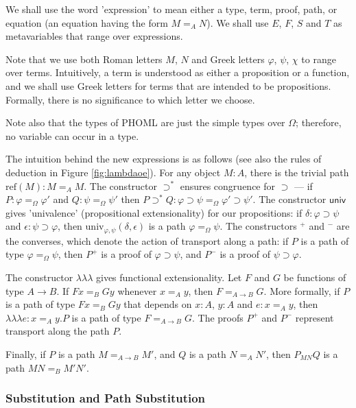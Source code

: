 \documentclass[a4paper,UKenglish]{lipics-v2016}
\newcommand*{\reff}[1]{\ensuremath{\mathrm{ref} \left( {#1} \right)}}
\newcommand*{\univ}[4]{\ensuremath{\mathrm{univ}_{{#1}, {#2}} \left({#3} , {#4} \right)}}
\newcommand*{\triplelambda}{\ensuremath{\lambda \!\! \lambda \!\! \lambda}}
\theoremstyle{plain}
\theoremstyle{definition}
\begin{document}
We shall use the word 'expression' to mean either a type, term, proof, path, or equation (an equation having the form $M =_A N$).  We shall use $E$, $F$, $S$ and $T$ as metavariables that range over expressions.

Note that we use both Roman letters $M$, $N$ and Greek letters $\varphi$, $\psi$, $\chi$ to range over terms.  Intuitively, a term is understood as either a proposition or a function,
and we shall use Greek letters for terms that are intended to be propositions.  Formally, there is no significance to which letter we choose.

Note also that the types of PHOML are just the simple types over $\Omega$; therefore, no variable can occur in a type.

The intuition behind the new expressions is as follows (see also the rules of deduction in Figure \ref{fig:lambdaoe}).  For any object $M : A$, there is the trivial path $\reff{M} : M =_A M$.  The constructor $\supset^*$ ensures congruence for $\supset$ --- if $P : \varphi =_\Omega \varphi'$ and $Q : \psi =_\Omega \psi'$ then $P \supset^* Q : \varphi \supset \psi =_\Omega \varphi' \supset \psi'$.  The constructor $\mathsf{univ}$ gives 'univalence' (propositional extensionality) for our propositions: if $\delta : \varphi \supset \psi$ and $\epsilon : \psi \supset \varphi$, then $\univ{\varphi}{\psi}{\delta}{\epsilon}$ is a path $\varphi =_\Omega \psi$.  The constructors $^+$ and $^-$ are the converses, which denote the action of transport along a path: if $P$ is a path of type $\varphi =_\Omega \psi$, then $P^+$ is a proof of $\varphi \supset \psi$, and $P^-$ is a proof of $\psi \supset \varphi$.  

The constructor $\triplelambda$ gives functional extensionality.  Let $F$ and $G$ be functions of type $A \rightarrow B$.  If $F x =_B G y$ whenever $x =_A y$, then $F =_{A \rightarrow B} G$.  More formally, if $P$ is a path of type $Fx =_B Gy$ that depends on $x : A$, $y : A$ and $e : x =_A y$, then $\triplelambda e : x =_A y . P$ is a path of type $F =_{A \rightarrow B} G$.  The proofs $P^+$ and $P^-$ represent transport along the path $P$.

Finally, if $P$ is a path $M =_{A \rightarrow B} M'$, and $Q$ is a path $N =_A N'$, then $P_{MN} Q$ is a path $MN =_B M'N'$.

\subsubsection{Substitution and Path Substitution}
\end{document}

